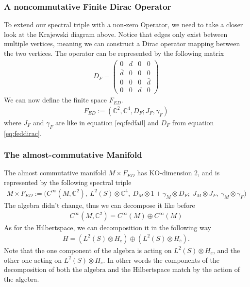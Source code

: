 \subsubsection{A noncommutative Finite Dirac Operator}
To extend our spectral triple with a non-zero Operator, we need to take a
closer look at the Krajewski diagram above. Notice that edges only exist
between multiple vertices, meaning we can construct a Dirac operator mapping
between the two vertices. The operator can be represented by the following matrix
\begin{align}\label{eq:feddirac}
    D_F =
    \begin{pmatrix}
    0 & d & 0 & 0 \\
    \bar{d} & 0 & 0 & 0 \\
    0 & 0 & 0 & \bar{d} \\
    0 & 0 & d & 0
    \end{pmatrix}
\end{align}
We can now define the finite space $F_{ED}$.
\begin{align}
    F_{ED} := (\mathbb{C}^2, \mathbb{C}^4, D_F; J_F, \gamma_F)
\end{align}
where $J_F$ and $\gamma_F$ are like in equation \ref{eq:fedfail} and $D_F$
from equation \ref{eq:feddirac}.

\subsubsection{The almost-commutative Manifold}
The almost commutative manifold $M\times F_{ED}$ has KO-dimension 2, and is
represented by the following spectral triple
\begin{align}
    M\times F_{ED} := \big(C^\infty(M,\mathbb{C}^2),\ L^2(S)\otimes
    \mathbb{C}^4,\
    D_M\otimes 1 +\gamma _M \otimes D_F;\; J_M\otimes J_F,\ \gamma_M\otimes
    \gamma _F\big)
\end{align}
The algebra didn't change, thus we can decompose it like before
\begin{align}
    C^\infty(M, \mathbb{C}^2) = C^\infty (M) \oplus C^\infty (M)
\end{align}
As for the Hilbertspace, we can decomposition it in the following way
\begin{align}
    H = (L^2(S) \otimes H_e ) \oplus (L^2(S) \otimes H_{\bar{e}}).
\end{align}
Note that the one component of the algebra is acting on $L^2(S) \otimes H_e$,
and the other one acting on $L^2(S) \otimes H_{\bar{e}}$. In other words the components of
the decomposition of both the algebra and the Hilbertspace match by the action of
the algebra.

